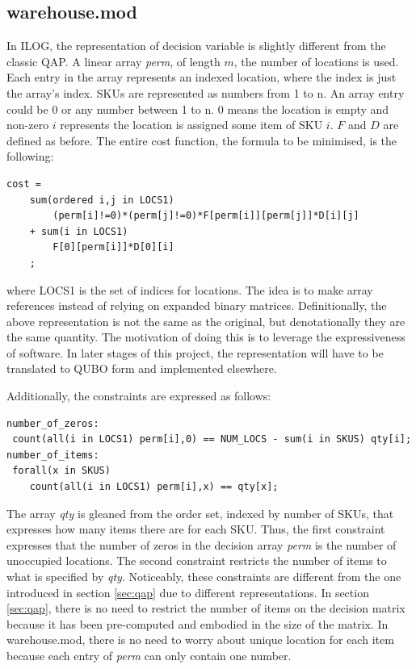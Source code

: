 \documentclass[hyp]{socreport}
\begin{document}
\subsection{warehouse.mod}
In ILOG, the representation of decision variable is slightly different from the classic QAP. A linear array \textit{perm}, of length $m$, the number of locations is used. Each entry in the array represents an indexed location, where the index is just the array's index. SKUs are represented as numbers from 1 to n. An array entry could be 0 or any number between 1 to n. 0 means the location is empty and non-zero $i$ represents the location is assigned some item of SKU $i$. $F$ and $D$ are defined as before. The entire cost function, the formula to be minimised, is the following:
\begin{verbatim}
cost = 
 	sum(ordered i,j in LOCS1)
 		(perm[i]!=0)*(perm[j]!=0)*F[perm[i]][perm[j]]*D[i][j]
 	+ sum(i in LOCS1)
 		F[0][perm[i]]*D[0][i]
 	;
\end{verbatim}
where LOCS1 is the set of indices for locations. The idea is to make array references instead of relying on expanded binary matrices. Definitionally, the above representation is not the same as the original, but denotationally they are the same quantity. The motivation of doing this is to leverage the expressiveness of software. In later stages of this project, the representation will have to be translated to QUBO form and implemented elsewhere.

Additionally, the constraints are expressed as follows:
\begin{verbatim}
number_of_zeros:
 count(all(i in LOCS1) perm[i],0) == NUM_LOCS - sum(i in SKUS) qty[i];
number_of_items:
 forall(x in SKUS)
 	count(all(i in LOCS1) perm[i],x) == qty[x];
\end{verbatim}

The array \textit{qty} is gleaned from the order set, indexed by number of SKUs, that expresses how many items there are for each SKU. Thus, the first constraint expresses that the number of zeros in the decision array \textit{perm} is the number of unoccupied locations. The second constraint restricts the number of items to what is specified by \textit{qty}. Noticeably, these constraints are different from the one introduced in section \ref{sec:qap} due to different representations. In section \ref{sec:qap}, there is no need to restrict the number of items on the decision matrix because it has been pre-computed and embodied in the size of the matrix. In warehouse.mod, there is no need to worry about unique location for each item because each entry of \textit{perm} can only contain one number.
\end{document}
